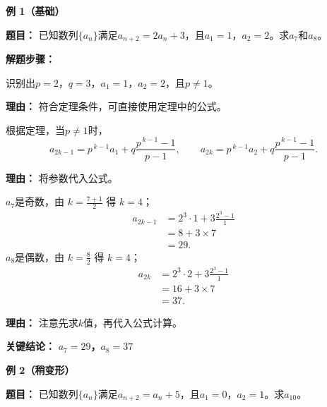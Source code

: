 \begin{examplebox}
	\textbf{\textcolor{CExample}{例 1（基础）}}

	\textbf{\textcolor{CExample}{题目：}}
	已知数列$\{a_n\}$满足$a_{n+2}=2a_n+3$，且$a_1=1$，$a_2=2$。求$a_7$和$a_8$。

	\textbf{\textcolor{CExample}{解题步骤：}}
	\begin{description}[style=nextline, leftmargin=2.8em, labelsep=0.5em, itemsep=0.45em]
		\item[\textbf{第一步（参数识别）：}] 识别出$p=2$，$q=3$，$a_1=1$，$a_2=2$，且$p\neq1$。
			\par\textbf{理由：} 符合定理条件，可直接使用定理中的公式。
		\item[\textbf{第二步（公式套用）：}] 根据定理，当$p\neq1$时，
			\[
				a_{2k-1}=p^{\,k-1}a_1+q\frac{p^{\,k-1}-1}{p-1},
				\qquad
				a_{2k}=p^{\,k-1}a_2+q\frac{p^{\,k-1}-1}{p-1}.
			\]
			\par\textbf{理由：} 将参数代入公式。
		\item[\textbf{第三步（数值计算）：}] $a_7$是奇数，由 $k=\frac{7+1}{2}$ 得 $k=4$；
			\[
				\begin{aligned}
					a_{2k-1} &= 2^{3}\cdot1+3\frac{2^{3}-1}{1} \\
					&= 8+3\times7 \\
					&= 29.
			\end{aligned}
			\]
			$a_8$是偶数，由 $k=\frac{8}{2}$ 得 $k=4$；
			\[
				\begin{aligned}
					a_{2k} &= 2^{3}\cdot2+3\frac{2^{3}-1}{1} \\
					&= 16+3\times7 \\
					&= 37.
			\end{aligned}
			\]
			\par\textbf{理由：} 注意先求$k$值，再代入公式计算。
	\end{description}

	\textbf{\textcolor{CExample}{关键结论：}}
	\textbf{$a_7=29$，$a_8=37$}

	\medskip
	\textbf{\textcolor{CExample}{例 2（稍变形）}}

	\textbf{\textcolor{CExample}{题目：}}
	已知数列$\{a_n\}$满足$a_{n+2}=a_n+5$，且$a_1=0$，$a_2=1$。求$a_{10}$。


\end{examplebox}
